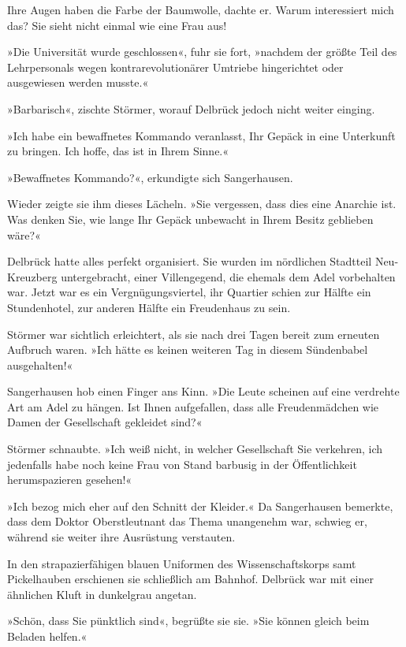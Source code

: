 Ihre Augen haben die Farbe der Baumwolle, dachte er. Warum
interessiert mich das? Sie sieht nicht einmal wie eine Frau aus!

»Die Universität wurde geschlossen«, fuhr sie fort, »nachdem der
größte Teil des Lehrpersonals wegen kontrarevolutionärer Umtriebe
hingerichtet oder ausgewiesen werden musste.«

»Barbarisch«, zischte Störmer, worauf Delbrück jedoch nicht weiter
einging.

»Ich habe ein bewaffnetes Kommando veranlasst, Ihr Gepäck in eine
Unterkunft zu bringen. Ich hoffe, das ist in Ihrem Sinne.«

»Bewaffnetes Kommando?«, erkundigte sich Sangerhausen.

Wieder zeigte sie ihm dieses Lächeln. »Sie vergessen, dass dies
eine Anarchie ist. Was denken Sie, wie lange Ihr Gepäck unbewacht
in Ihrem Besitz geblieben wäre?«

\bigpar

Delbrück hatte alles perfekt organisiert. Sie wurden im nördlichen
Stadtteil Neu-Kreuzberg untergebracht, einer Villengegend, die
ehemals dem Adel vorbehalten war. Jetzt war es ein
Vergnügungsviertel, ihr Quartier schien zur Hälfte ein
Stundenhotel, zur anderen Hälfte ein Freudenhaus zu sein.

Störmer war sichtlich erleichtert, als sie nach drei Tagen bereit
zum erneuten Aufbruch waren. »Ich hätte es keinen weiteren Tag in
diesem Sündenbabel ausgehalten!«

Sangerhausen hob einen Finger ans Kinn. »Die Leute scheinen auf
eine verdrehte Art am Adel zu hängen. Ist Ihnen aufgefallen, dass
alle Freudenmädchen wie Damen der Gesellschaft gekleidet sind?«

Störmer schnaubte. »Ich weiß nicht, in welcher Gesellschaft Sie
verkehren, ich jedenfalls habe noch keine Frau von Stand barbusig
in der Öffentlichkeit herumspazieren gesehen!«

»Ich bezog mich eher auf den Schnitt der Kleider.« Da Sangerhausen
bemerkte, dass dem Doktor Oberstleutnant das Thema unangenehm war,
schwieg er, während sie weiter ihre Ausrüstung verstauten.

In den strapazierfähigen blauen Uniformen des Wissenschaftskorps
samt Pickelhauben erschienen sie schließlich am Bahnhof. Delbrück
war mit einer ähnlichen Kluft in dunkelgrau angetan.

»Schön, dass Sie pünktlich sind«, begrüßte sie sie. »Sie können
gleich beim Beladen helfen.«

